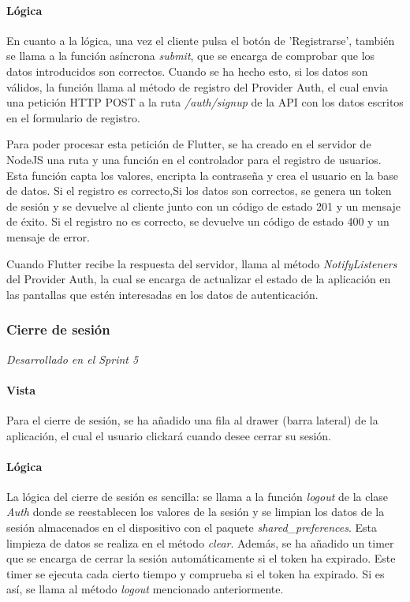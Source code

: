 \paragraph*{Lógica}
En cuanto a la lógica, una vez el cliente pulsa el botón de 'Registrarse', también se llama a la función asíncrona \textit{submit}, que se encarga de comprobar que los datos introducidos 
son correctos. Cuando se ha hecho esto, si los datos son válidos, la función llama al método de registro del Provider Auth, el cual envia una petición HTTP POST a la ruta \textit{/auth/signup}
 de la API con los datos escritos en el formulario de registro. 

Para poder procesar esta petición de Flutter, se ha creado en el servidor de NodeJS una ruta y una función en el controlador para el registro de usuarios.
 Esta función capta los valores, encripta la contraseña y crea el usuario en la base de datos. Si el registro es correcto,Si los datos son correctos, se genera un token de sesión y
  se devuelve al cliente junto con un código de estado 201 y un mensaje de éxito. Si el registro no es correcto, se devuelve un código de estado 400 y un mensaje de error.

  Cuando Flutter recibe la respuesta del servidor, llama al método \textit{NotifyListeners} del Provider Auth, la cual se encarga de actualizar el estado de la aplicación en las pantallas que estén
  interesadas en los datos de autenticación.

\subsubsection{Cierre de sesión}
\textit{Desarrollado en el Sprint 5}
\paragraph*{Vista}
Para el cierre de sesión, se ha añadido una fila al drawer (barra lateral) de la aplicación, el cual el usuario clickará cuando desee cerrar su sesión.

\paragraph*{Lógica}
La lógica del cierre de sesión es sencilla: se llama a la función \textit{logout} de la clase \textit{Auth} donde se reestablecen los valores de la sesión y se limpian los datos de la sesión almacenados en el dispositivo con el paquete \textit{shared\_preferences}. 
Esta limpieza de datos se realiza en el método \textit{clear}.
Además, se ha añadido un timer que se encarga de cerrar la sesión automáticamente si el token ha expirado. Este timer se ejecuta cada cierto tiempo y comprueba si el token ha expirado. Si es así, se llama al método \textit{logout} mencionado anteriormente.

